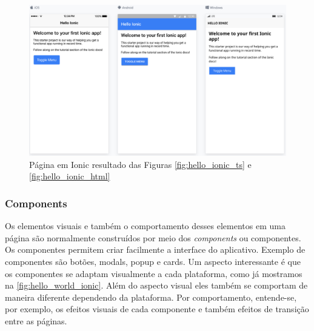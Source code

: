 \begin{figure}[h]
  \centering
  \includegraphics[scale=.4]{imagens/hello_world_ionic.png}
  \caption{Página em Ionic resultado  das Figuras \ref{fig:hello_ionic_ts} e \ref{fig:hello_ionic_html}}
  \label{fig:hello_world_ionic}
\end{figure}


\subsubsection{Components}

Os elementos visuais e também o comportamento desses elementos em uma página
são normalmente construídos por meio dos \textit{components} ou componentes.
Os componentes permitem criar facilmente a interface do aplicativo. Exemplo de
componentes são botões, modals, popup e cards. Um aspecto interessante é que
os componentes se adaptam visualmente a cada plataforma, como já mostramos na \autoref{fig:hello_world_ionic}.
Além do aspecto visual eles também se comportam de maneira diferente dependendo da plataforma.
Por comportamento, entende-se, por exemplo, os efeitos visuais de cada componente e também efeitos
de  transição entre as páginas.

